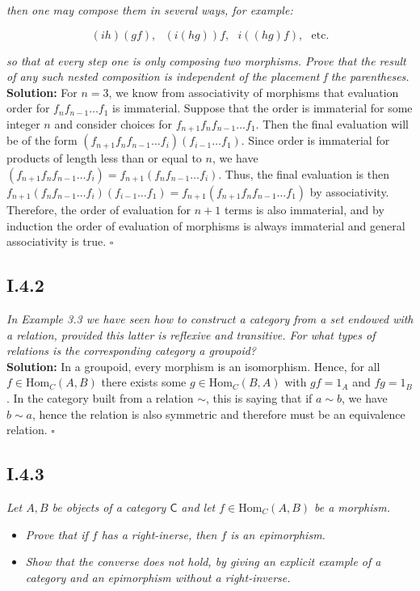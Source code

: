 \documentclass[11pt,a4paper]{article}
\newcommand{\morph}[3]{\text{Hom}_{#1}(#2,#3)}
\begin{document}
\noindent \textit{then one may compose them in several ways, for example:}

$$(ih)(gf),\text{  }(i(hg))f,\text{  }i((hg)f),\text{  }\text{etc.}$$

\noindent \textit{so that at every step one is only composing two morphisms.  Prove that the result of any such nested composition is independent of the placement f the parentheses.}\\

\noindent\textbf{Solution: } For $n = 3$, we know from associativity of morphisms that evaluation order for $f_n f_{n-1}\dots f_1$ is immaterial.  Suppose that the order is immaterial for some integer $n$ and consider choices for $f_{n+1}f_n f_{n-1}\dots f_1$.  Then the final evaluation will be of the form $(f_{n+1}f_n f_{n-1} \dots f_i)(f_{i-1}\dots f_1)$.  Since order is immaterial for products of length less than or equal to $n$, we have $(f_{n+1}f_n f_{n-1} \dots f_i) = f_{n+1}(f_n f_{n-1} \dots f_i)$.  Thus, the final evaluation is then $f_{n+1}(f_n f_{n-1} \dots f_i)(f_{i-1}\dots f_1) = f_{n+1}(f_{n+1}f_n f_{n-1}\dots f_1)$ by associativity.  Therefore, the order of evaluation for $n+1$ terms is also immaterial, and by induction the order of evaluation of morphisms is always immaterial and general associativity is true. $\square$

\subsection*{I.4.2} \textit{In Example 3.3 we have seen how to construct a category from a set endowed with a relation, provided this latter is reflexive and transitive.  For what types of relations is the corresponding category a groupoid?} \\

\noindent \textbf{Solution: } In a groupoid, every morphism is an isomorphism.  Hence, for all $f \in \morph{C}{A}{B}$ there exists some $g \in \morph{C}{B}{A}$ with $gf=1_A$ and $fg = 1_B$.  In the category built from a relation $\sim$, this is saying that if $a \sim b$, we have $b \sim a$, hence the relation is also symmetric and therefore must be an equivalence relation. $\square$

\subsection*{I.4.3} \textit{Let $A,B$ be objects of a category $\textsf{C}$ and let $f \in \morph{C}{A}{B}$ be a morphism.}
\begin{itemize}
\item \textit{Prove that if $f$ has a right-inerse, then $f$ is an epimorphism.}
\item \textit{Show that the converse does not hold, by giving an explicit example of a category and an epimorphism without a right-inverse.}
\end{itemize}
\end{document}

